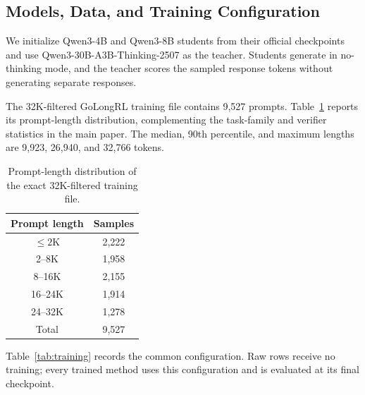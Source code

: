 \subsection{Models, Data, and Training Configuration}

We initialize Qwen3-4B and Qwen3-8B students from their official checkpoints
and use Qwen3-30B-A3B-Thinking-2507 as the teacher. Students generate in
no-thinking mode, and the teacher scores the sampled response tokens without
generating separate responses.

The 32K-filtered GoLongRL training file contains 9,527 prompts.
Table~\ref{tab:data} reports its prompt-length distribution, complementing the
task-family and verifier statistics in the main paper. The median, 90th
percentile, and maximum lengths are 9,923, 26,940, and 32,766 tokens.

\begin{table}[t]
\captionsetup{justification=raggedright,singlelinecheck=false,skip=6pt}
\caption{Prompt-length distribution of the exact 32K-filtered training file.}
\label{tab:data}
\centering
{\small
\setlength{\tabcolsep}{6pt}
\renewcommand{\arraystretch}{1.05}
\begin{tabular*}{0.36\textwidth}{@{\extracolsep{\fill}}cc@{}}
\toprule
\textbf{Prompt length} & \textbf{Samples} \\
\midrule
$\leq 2$K & 2,222 \\
2--8K & 1,958 \\
8--16K & 2,155 \\
16--24K & 1,914 \\
24--32K & 1,278 \\
\midrule
Total & 9,527 \\
\bottomrule
\end{tabular*}
}
\end{table}

Table~\ref{tab:training} records the common configuration. Raw rows receive no
training; every trained method uses this configuration and is evaluated at
its final checkpoint.

